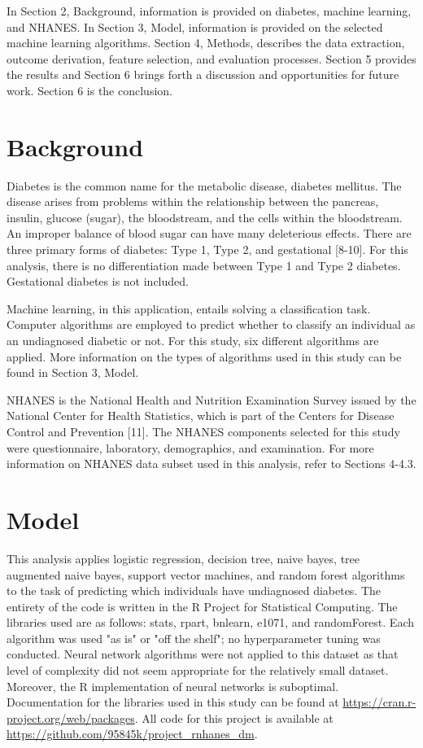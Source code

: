 \documentclass[twoside,11pt]{article}
\begin{document}
In Section 2, Background, information is provided on diabetes, machine learning, and NHANES. In Section 3, Model, information is provided on the selected machine learning algorithms. Section 4, Methods, describes the data extraction, outcome derivation, feature selection, and evaluation processes. Section 5 provides the results and Section 6 brings forth a discussion and opportunities for future work. Section 6 is the conclusion. 

\section{Background} \label{background}
Diabetes is the common name for the metabolic disease, diabetes mellitus. The disease arises from problems within the relationship between the pancreas, insulin, glucose (sugar), the bloodstream, and the cells within the bloodstream. An improper balance of blood sugar can have many deleterious effects. There are three primary forms of diabetes: Type 1, Type 2, and gestational [8-10]. For this analysis, there is no differentiation made between Type 1 and Type 2 diabetes. Gestational diabetes is not included. 

Machine learning, in this application, entails solving a classification task. Computer algorithms are employed to predict whether to classify an individual as an undiagnosed diabetic or not. For this study, six different algorithms are applied. More information on the types of algorithms used in this study can be found in Section 3, Model. 

NHANES is the National Health and Nutrition Examination Survey issued by the National Center for Health Statistics, which is part of the Centers for Disease Control and Prevention [11]. The NHANES components selected for this study were questionnaire, laboratory, demographics, and examination. For more information on NHANES data subset used in this analysis, refer to Sections 4-4.3. 

\section{Model} \label{model}
This analysis applies logistic regression, decision tree, naive bayes, tree augmented naive bayes, support vector machines, and random forest algorithms to the task of predicting which individuals have undiagnosed diabetes. The entirety of the code is written in the R Project for Statistical Computing. The libraries used are as follows: stats, rpart, bnlearn, e1071, and randomForest. Each algorithm was used "as is" or "off the shelf"; no hyperparameter tuning was conducted. Neural network algorithms were not applied to this dataset as that level of complexity did not seem appropriate for the relatively small dataset. Moreover, the R implementation of neural networks is suboptimal. Documentation for the libraries used in this study can be found at \url{https://cran.r-project.org/web/packages}. All code for this project is available at \url{https://github.com/95845k/project_rnhanes_dm}.
\end{document}
